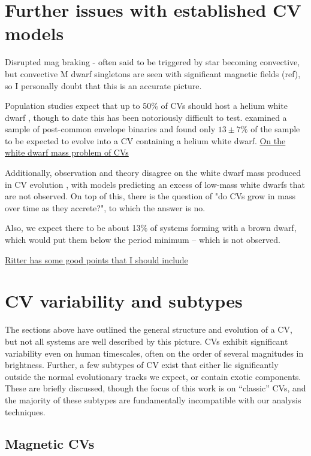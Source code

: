 \section{Further issues with established CV models}

Disrupted mag braking - often said to be triggered by star becoming convective, but convective M dwarf singletons are seen with significant magnetic fields (ref), so I personally doubt that this is an accurate picture.

Population studies expect that up to 50\% of CVs should host a helium white dwarf \citep{politano1996}, though to date this has been notoriously difficult to test. 
\citet{zorotovic2010} examined a sample of post-common envelope binaries and found only $13\pm7\%$ of the sample to be expected to evolve into a CV containing a helium white dwarf. \href{https://arxiv.org/pdf/1609.06940.pdf}{On the white dwarf mass problem of CVs}

Additionally, observation and theory disagree on the white dwarf mass produced in CV evolution \citep{Wijnen2015, liu2016, parsons2017}, with models predicting an excess of low-mass white dwarfs that are not observed. 
On top of this, there is the question of "do CVs grow in mass over time as they accrete?", to which the answer is no. 

Also, we expect there to be about 13\% of systems forming with a brown dwarf, which would put them below the period minimum -- which is not observed.

\href{https://articles.adsabs.harvard.edu/pdf/2010MmSAI..81..849R}{Ritter has some good points that I should include}




\section{CV variability and subtypes}
The sections above have outlined the general structure and evolution of a CV, but not all systems are well described by this picture. CVs exhibit significant variability even on human timescales, often on the order of several magnitudes in brightness. Further, a few subtypes of CV exist that either lie significantly outside the normal evolutionary tracks we expect, or contain exotic components. These are briefly discussed, though the focus of this work is on ``classic'' CVs, and the majority of these subtypes are fundamentally incompatible with our analysis techniques.


\subsection{Magnetic CVs}
\label{sect:introduction:magnetic CVs}

